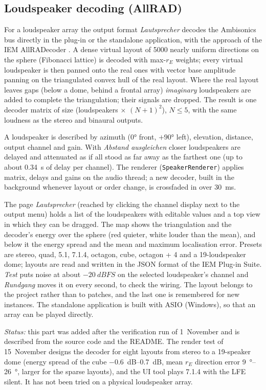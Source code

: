 \documentclass[11pt,a4paper,parskip=half,DIV=11,toc=bibliography]{scrartcl}
\newcommand{\ui}[1]{\emph{#1}}                 %
\newcommand{\fn}[1]{\mbox{\texttt{#1}}}
\begin{document}
\subsection{Loudspeaker decoding (AllRAD)}
\label{sec:allrad}
For a loudspeaker array the output format \ui{Lautsprecher} decodes the Ambisonics bus directly in the
plug-in or the standalone application, with the approach of the IEM AllRADecoder
\citep{zotter2012allrad,iemsuite}. A dense virtual layout of 5000 nearly uniform directions on the sphere
(Fibonacci lattice) is decoded with max-$r_E$ weights; every virtual loudspeaker is then panned onto the
real ones with vector base amplitude panning \citep{pulkki1997vbap} on the triangulated convex hull of the
real layout. Where the real layout leaves gaps (below a dome, behind a frontal array) \emph{imaginary}
loudspeakers are added to complete the triangulation; their signals are dropped. The result is one
decoder matrix of size (loudspeakers $\times$ $(N+1)^2$), $N\le5$, with the same loudness as the stereo and binaural
outputs.

A loudspeaker is described by azimuth ($0°$ front, $+90°$ left), elevation, distance, output channel and
gain. With \ui{Abstand ausgleichen} closer loudspeakers are delayed and attenuated as if all stood as far
away as the farthest one (up to about \SI{0.34}{s} of delay per channel). The renderer
(\fn{SpeakerRenderer}) applies matrix, delays and gains on the audio thread; a new decoder, built in the
background whenever layout or order change, is crossfaded in over \SI{30}{ms}.

The page \ui{Lautsprecher} (reached by clicking the channel display next to the output menu) holds a list
of the loudspeakers with editable values and a top view in which they can be dragged. The map shows the
triangulation and the decoder's energy over the sphere (red quieter, white louder than the mean), and
below it the energy spread and the mean and maximum localisation error. Presets are stereo, quad, 5.1, 7.1.4,
octagon, cube, octagon + 4 and a 19-loudspeaker dome; layouts are read and written in the JSON format of the
IEM Plug-in Suite. \ui{Test} puts noise at about $-\SI{20}{dBFS}$ on the selected loudspeaker's channel and
\ui{Rundgang} moves it on every second, to check the wiring. The layout belongs to the project rather than
to patches, and the last one is remembered for new instances. The standalone application is built with ASIO
(Windows), so that an array can be played directly.

\emph{Status:} this part was added after the verification run of 1~November and is described from the source code and the README.
The render test of 15~November designs the decoder for eight layouts from stereo to a 19-speaker dome (energy spread of the cube
\SIrange{-0.6}{0.7}{dB}, mean $r_E$ direction error \SIrange{9}{26}{\degree}, larger for the sparse layouts), and the UI tool plays 7.1.4 with the
LFE silent. It has not been tried on a physical loudspeaker array.
\end{document}
